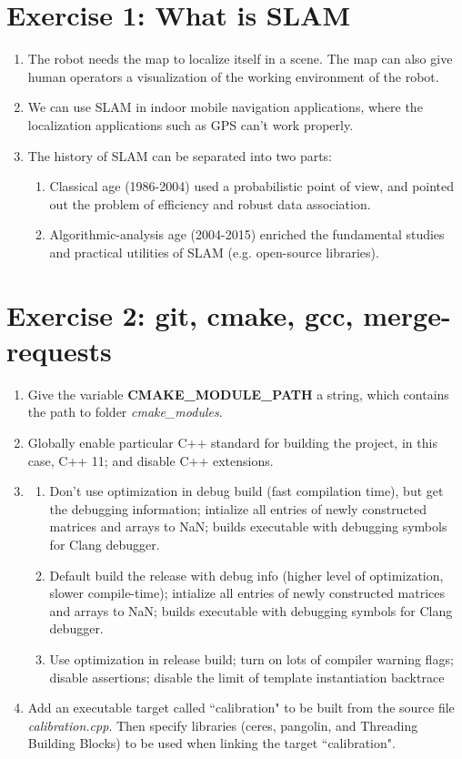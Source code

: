\documentclass[12pt,letterpaper]{article}
\begin{document}
\section*{Exercise 1: What is SLAM}

\begin{enumerate}
	\item The robot needs the map to localize itself in a scene. The map can also give human operators a visualization of the working environment of the robot.
	\item We can use SLAM in indoor mobile navigation applications, where the localization applications such as GPS can't work properly. 
	\item The history of SLAM can be separated into two parts:
	\begin{enumerate}
		\item Classical age (1986-2004) used a probabilistic point of view, and pointed out the problem of efficiency and robust data association.
		\item Algorithmic-analysis age (2004-2015) enriched the fundamental studies and practical utilities of SLAM (e.g. open-source libraries).
	\end{enumerate} 

\end{enumerate}

\section*{Exercise 2: git, cmake, gcc, merge-requests}
\begin{enumerate}
	\item Give the variable \textbf{CMAKE\_MODULE\_PATH} a string, which contains the path to folder \textit{cmake\_modules}.
	\item Globally enable particular C++ standard for building the project, in this case, C++ 11; and disable C++ extensions.
	\item
	\begin{enumerate}
		\item Don't use optimization in debug build (fast compilation time), but get the debugging information; intialize all entries of newly constructed matrices and arrays to NaN; builds executable with debugging symbols for Clang debugger.
		\item Default build the release with debug info (higher level of optimization, slower compile-time); intialize all entries of newly constructed matrices and arrays to NaN; builds executable with debugging symbols for Clang debugger.
		\item Use optimization in release build; turn on lots of compiler warning flags; disable assertions; disable the limit of template instantiation backtrace
	\end{enumerate}
	\item Add an executable target called ``calibration" to be built from the source file \textit{calibration.cpp}. Then specify libraries (ceres, pangolin, and Threading Building Blocks) to be used when linking the target ``calibration".
\end{enumerate}
\end{document}
